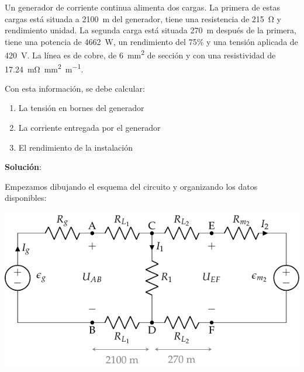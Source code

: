 \begin{example}\label{ex.motor2-bt1}

  Un generador de corriente continua alimenta dos cargas. La primera
  de estas cargas está situada a \qty{2100}{\meter} del generador,
  tiene una resistencia de \qty{215}{\ohm} y rendimiento unidad. La
  segunda carga está situada \qty{270}{\meter} después de la primera,
  tiene una potencia de \qty{4662}{\watt}, un rendimiento del 75\% y
  una tensión aplicada de \qty{420}{\volt}.  La línea es de cobre, de
  \qty{6}{\milli\meter\squared} de sección y con una resistividad de
  \qty{17.24}{\milli\ohm\milli\meter\squared\per\meter}.
    
  \vspace{2mm}
    
  Con esta información, se debe calcular:
    
  \begin{enumerate}
  \item La tensión en bornes del generador
  \item La corriente entregada por el generador
  \item El rendimiento de la instalación
  \end{enumerate}
    
  \hrulefill

  \vspace{5mm} \textbf{Solución}: \vspace{4mm}

  Empezamos dibujando el esquema del circuito y organizando los datos
  disponibles: \vspace{6mm}
    
    \begin{minipage}{0.725\linewidth}
      \includegraphics[scale=1]{../figs/circuito_ejercicio2_BT1.pdf}
    \end{minipage}
    \begin{minipage}{0.275\linewidth}
    

\end{minipage}
\end{example}
